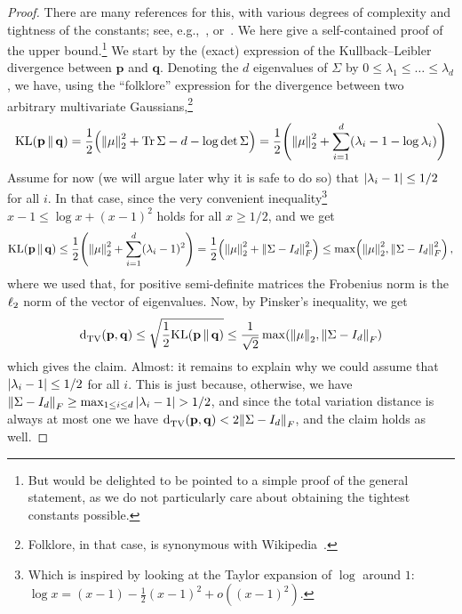 \documentclass[10pt]{article}
\newcommand{\dims}{d}
\newcommand{\p}{\mathbf{p}}
\newcommand{\q}{\mathbf{q}}
\theoremstyle{plain}
\begin{document}
\begin{proof}
There are many references for this, with various degrees of complexity and tightness of the constants; see, e.g.,~\cite[Corollary~1.4.6]{Li2018}, or~\cite[Theorem~1.3]{DevroyeMR2018}. We here give a self-contained proof of the upper bound.\footnote{But would be delighted to be pointed to a simple proof of the general statement, as we do not particularly care about obtaining the tightest constants possible.}
We start by the (exact) expression of the Kullback--Leibler divergence between $\p$ and $\q$. Denoting the $\dims$ eigenvalues of $\Sigma$ by $0\leq \lambda_1\leq \dots\leq \lambda_\dims$, we have, using the ``folklore'' expression for the divergence between two arbitrary multivariate Gaussians,\footnote{Folklore, in that case, is synonymous with Wikipedia~\cite{wiki:KL}.}
\[
  \kldiv{\p}{\q} 
  = \frac{1}{2}\mleft(  \normtwo{\mu}^2 + \operatorname{Tr}\Sigma -\dims - \log \det \Sigma \mright)
  = \frac{1}{2}\mleft(  \normtwo{\mu}^2 + \sum_{i=1}^\dims (\lambda_i - 1 - \log \lambda_i) \mright)
\]
Assume for now (we will argue later why it is safe to do so) that $\abs{\lambda_i - 1}\leq 1/2$ for all $i$. In that case, since the very convenient inequality\footnote{Which is inspired by looking at the Taylor expansion of $\log$ around $1$: $\log x = (x-1) - \frac{1}{2}(x-1)^2 + o((x-1)^2)$.}
$
  x-1 \leq \log x + (x-1)^2
$ holds for all $x\geq 1/2$, and 
we get 
\[
  \kldiv{\p}{\q} \leq  \frac{1}{2}\mleft(  \normtwo{\mu}^2 + \sum_{i=1}^\dims (\lambda_i - 1)^2 \mright) = \frac{1}{2}\mleft(  \normtwo{\mu}^2 + \norm{\Sigma-I_\dims}_F^2 \mright)
  \leq \max\mleft(  \normtwo{\mu}^2, \norm{\Sigma-I_\dims}_F^2 \mright)\,,
\]
where we used that, for positive semi-definite matrices the Frobenius norm is the $\lp[2]$ norm of the vector of eigenvalues. Now, by Pinsker's inequality, we get
\[
    \totalvardist{\p}{\q} \leq \sqrt{\frac{1}{2}\kldiv{\p}{\q}} \leq \frac{1}{\sqrt{2}}\max\mleft(  \normtwo{\mu}, \norm{\Sigma-I_\dims}_F \mright)
\]
which gives the claim. Almost: it remains to explain why we could assume that $\abs{\lambda_i - 1}\leq 1/2$ for all $i$. This is just because, otherwise, we have
$\norm{\Sigma-I_\dims}_F \geq \max_{1\leq i \leq \dims} \abs{\lambda_i - 1} > 1/2$, and since the total variation distance is always at most one we have $\totalvardist{\p}{\q} < 2\norm{\Sigma-I_\dims}_F$, and the claim holds as well.


\end{proof}
\end{document}
